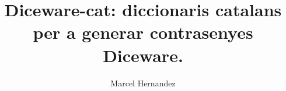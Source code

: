 \documentclass[a4paper,11pt]{article}
\title{Diceware-cat: diccionaris catalans per a generar contrasenyes Diceware.}
\author{Marcel Hernandez}
\begin{document}
\maketitle

\begin{multicols}{4}
  
\end{multicols}
\end{document}
